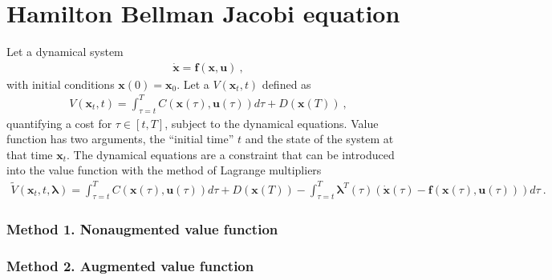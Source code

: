 \documentclass[letterpaper,10pt,english]{jupyterBook}
\begin{document}
\sphinxstepscope


\section{Hamilton Bellman Jacobi equation}
\label{\detokenize{ch/control/hjb:hamilton-bellman-jacobi-equation}}\label{\detokenize{ch/control/hjb:hamilton-bellman-jacobi}}\label{\detokenize{ch/control/hjb::doc}}
\sphinxAtStartPar
Let a dynamical system
\begin{equation*}
\begin{split}\dot{\mathbf{x}} = \mathbf{f}(\mathbf{x}, \mathbf{u}) \ ,\end{split}
\end{equation*}
\sphinxAtStartPar
with initial conditions \(\mathbf{x}(0) = \mathbf{x}_0\). Let a  \(V(\mathbf{x}_t, t)\) defined as
\begin{equation*}
\begin{split}V(\mathbf{x}_t, t) = \int_{\tau=t}^{T} C(\mathbf{x}(\tau), \mathbf{u}(\tau)) d \tau +  D(\mathbf{x}(T)) \ ,\end{split}
\end{equation*}
\sphinxAtStartPar
quantifying a cost for \(\tau \in [t, T]\), subject to the dynamical equations. Value function has two arguments, the “initial time” \(t\) and the state of the system at that time \(\mathbf{x}_t\). The dynamical equations are a constraint that can be introduced into the value function with the method of Lagrange multipliers
\begin{equation*}
\begin{split}\widetilde{V}(\mathbf{x}_t, t, \boldsymbol{\lambda}) = \int_{\tau=t}^{T} C(\mathbf{x}(\tau), \mathbf{u}(\tau)) d \tau +  D(\mathbf{x}(T)) - \int_{\tau=t}^T \boldsymbol\lambda^T(\tau) \left( \dot{\mathbf{x}}(\tau) - \mathbf{f}(\mathbf{x}(\tau), \mathbf{u}(\tau)) \right) d \tau \ .\end{split}
\end{equation*}\subsubsection*{Method 1. Non\sphinxhyphen{}augmented value function}
\subsubsection*{Method 2. Augmented value function}

\sphinxstepscope
\end{document}
